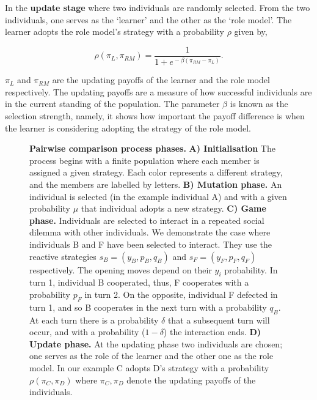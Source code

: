 \documentclass[11pt]{article}
\theoremstyle{plainCl1}
\theoremstyle{plainCl2}
\begin{document}
In the \textbf{update stage} where two individuals are randomly selected. From
the two individuals, one  serves as the `learner' and the other as the `role
model'. The learner adopts the role model's strategy with a probability \(\rho\)
given by,

\begin{equation} \label{Eq:rho}
    \rho(\pi_{L}, \pi_{RM}) = \frac{1}{1\!+\! e^{\!-\!\beta (\pi_{RM}\!-\! \pi_{L})}}.
\end{equation}

\(\pi_{L}\) and \(\pi_{RM}\) are the updating payoffs of the learner and the
role model respectively. The updating payoffs are a measure of how successful
individuals are in the current standing of the population. The parameter
\(\beta\) is known as the selection strength, namely, it shows how important the
payoff difference is when the learner is considering adopting the strategy of
the role model.

\begin{figure}[!htbp]
    \centering
    
    \caption{\textbf{Pairwise comparison process phases.} \textbf{A) Initialisation} The process begins
    with a finite population where each member is assigned a given strategy.
    Each color represents a different strategy, and the members are labelled by
    letters. \textbf{B) Mutation phase.} An individual is selected (in the
    example individual A) and with a given probability \(\mu\) that individual
    adopts a new strategy. \textbf{C) Game phase.} Individuals are
    selected to interact in a repeated social dilemma with other individuals. We
    demonstrate the case where individuals B and F have been selected to
    interact. They use the reactive strategies \(s_{B} = (y_B, p_B, q_B)\) and
    \(s_{F} = (y_F, p_F, q_F)\) respectively. The opening moves depend on their
    \(y_i\) probability. In turn 1, individual B cooperated,
    thus, F cooperates with a probability \(p_{F}\) in turn 2. On the opposite,
    individual F defected in turn 1, and so B cooperates in the next turn with
    a probability \(q_{B}\). At each turn there is a probability \(\delta\) that a
    subsequent turn will occur, and with a probability (\(1- \delta\)) the interaction ends.
    \textbf{D) Update phase.} At the updating phase two individuals are chosen;
    one serves as the role of the learner and the other one as the 
    role model. In our example C adopts D's strategy with a probability
    \(\rho(\pi_{C}, \pi_{D})\) where \(\pi_{C}, \pi_{D}\) denote the updating
    payoffs of the individuals.}\label{fig:pairwise_phases}
\end{figure}
\end{document}
